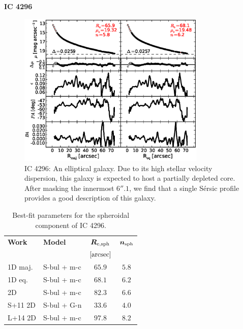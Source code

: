 \documentclass[preprint2]{emulateapj}
\newcommand{\fitfigurewidth}{0.8\textwidth}
\begin{document}
  \clearpage\newpage\noindent
  {\bf IC 4296 \\}

  \begin{figure}[h]
  \begin{center}
  \includegraphics[width=\fitfigurewidth]{images/ic4296_1Dfit.eps}
  \caption{IC 4296:
  An elliptical galaxy. 
  Due to its high stellar velocity dispersion, this galaxy is expected to host a partially depleted core. 
  After masking the innermost $6''.1$, 
  we find that a single S\'ersic profile provides a good description of this galaxy.}
  \end{center}
  \end{figure}

  \begin{table}[h]
  \small
  \caption{Best-fit parameters for the spheroidal component of IC 4296.}
  \begin{center}
  \begin{tabular}{llcc}
  \hline
  {\bf Work} & {\bf Model}   & $\bm R_{\rm e,sph}$    & $\bm n_{\rm sph}$ \\
    &  &  $[\rm arcsec]$ & \\
  \hline
  1D maj. & S-bul + m-c & $65.9$  &  $5.8$ \\
  1D eq.  & S-bul + m-c & $68.1$  &  $6.2$ \\
  2D      & S-bul + m-c & $82.3$  &  $6.6$ \\
  \hline
  S+11 2D         & S-bul + G-n & $33.6$  &  $4.0$ \\
  L+14 2D         & S-bul + m-c & $97.8$  &  $8.2$ \\
  \hline
  \end{tabular}
  \end{center}
  \label{tab:ic4296}
  \end{table}
\end{document}

